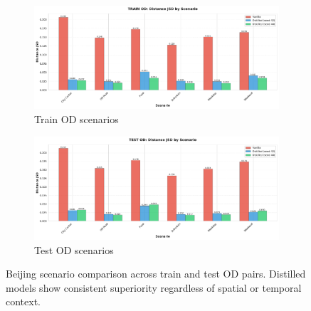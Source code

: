\begin{figure}[H]
    \centering
    \begin{subfigure}{0.49\linewidth}
        \centering
        \includegraphics[width=\linewidth]{assets/plots/eval/beijing/scenarios/train_od_scenario_comparison.pdf}
        \caption{Train OD scenarios}
    \end{subfigure}
    \begin{subfigure}{0.49\linewidth}
        \centering
        \includegraphics[width=\linewidth]{assets/plots/eval/beijing/scenarios/test_od_scenario_comparison.pdf}
        \caption{Test OD scenarios}
    \end{subfigure}
    \caption{Beijing scenario comparison across train and test OD pairs. Distilled models show consistent superiority regardless of spatial or temporal context.}
    \label{fig:appendix-beijing-scenario-comparison}
\end{figure}

